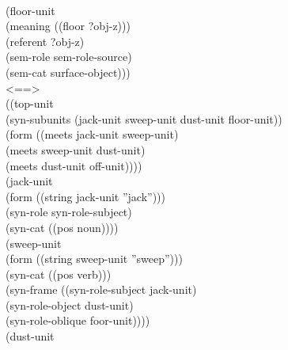 {{\\ \hspace*{2mm}(floor-unit
\\ \hspace*{5mm} (meaning ((floor ?obj-z)))
\\ \hspace*{5mm} (referent ?obj-z)
\\ \hspace*{5mm} (sem-role sem-role-source)
\\ \hspace*{5mm} (sem-cat surface-object)))
\\ <==>
\\ ((top-unit
\\ \hspace*{5mm} (syn-subunits (jack-unit sweep-unit dust-unit floor-unit))
\\ \hspace*{5mm} (form ((meets jack-unit sweep-unit) 
\\ \hspace*{19mm} (meets sweep-unit dust-unit)
\\ \hspace*{19mm} (meets dust-unit off-unit)))) 
\\ \hspace*{2mm}(jack-unit
\\ \hspace*{5mm} (form ((string jack-unit ''jack'')))
\\ \hspace*{5mm} (syn-role syn-role-subject)
\\ \hspace*{5mm} (syn-cat ((pos noun))))
\\ \hspace*{2mm}(sweep-unit
\\ \hspace*{5mm} (form ((string sweep-unit ''sweep'')))
\\ \hspace*{5mm} (syn-cat ((pos verb)))
\\ \hspace*{5mm} (syn-frame ((syn-role-subject jack-unit)
\\ \hspace*{30mm}(syn-role-object dust-unit)
\\ \hspace*{30mm}(syn-role-oblique foor-unit))))
\\ \hspace*{2mm}(dust-unit
}}
